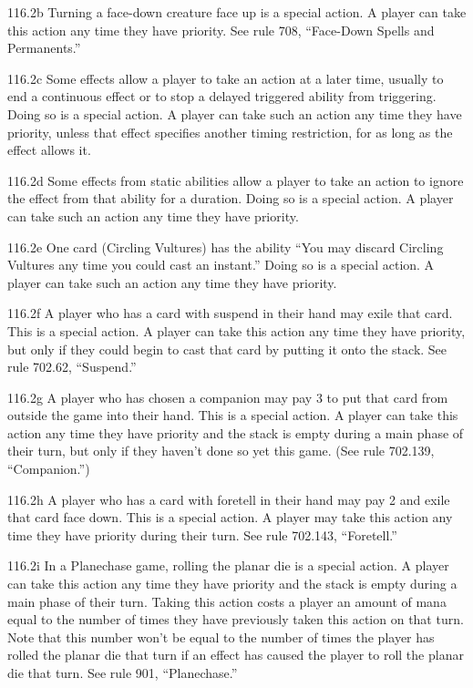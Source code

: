 116.2b Turning a face-down creature face up is a special action. A player can take this action any time they have priority. See rule 708, “Face-Down Spells and Permanents.”

116.2c Some effects allow a player to take an action at a later time, usually to end a continuous effect or to stop a delayed triggered ability from triggering. Doing so is a special action. A player can take such an action any time they have priority, unless that effect specifies another timing restriction, for as long as the effect allows it.

116.2d Some effects from static abilities allow a player to take an action to ignore the effect from that ability for a duration. Doing so is a special action. A player can take such an action any time they have priority.

116.2e One card (Circling Vultures) has the ability “You may discard Circling Vultures any time you could cast an instant.” Doing so is a special action. A player can take such an action any time they have priority.

116.2f A player who has a card with suspend in their hand may exile that card. This is a special action. A player can take this action any time they have priority, but only if they could begin to cast that card by putting it onto the stack. See rule 702.62, “Suspend.”

116.2g A player who has chosen a companion may pay {3} to put that card from outside the game into their hand. This is a special action. A player can take this action any time they have priority and the stack is empty during a main phase of their turn, but only if they haven’t done so yet this game. (See rule 702.139, “Companion.”)

116.2h A player who has a card with foretell in their hand may pay {2} and exile that card face down. This is a special action. A player may take this action any time they have priority during their turn. See rule 702.143, “Foretell.”

116.2i In a Planechase game, rolling the planar die is a special action. A player can take this action any time they have priority and the stack is empty during a main phase of their turn. Taking this action costs a player an amount of mana equal to the number of times they have previously taken this action on that turn. Note that this number won’t be equal to the number of times the player has rolled the planar die that turn if an effect has caused the player to roll the planar die that turn. See rule 901, “Planechase.”

